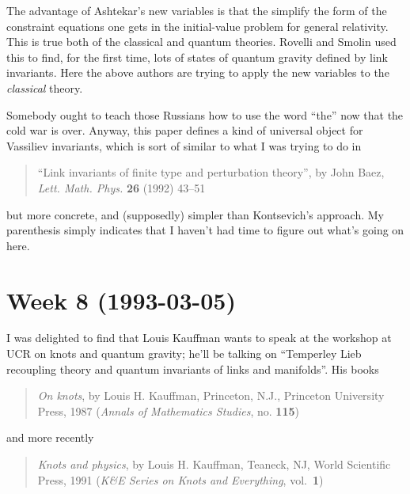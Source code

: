 \documentclass{article}
\def\tightlist{}
\renewcommand{\texttt}[1]{%
  \begingroup
  \ttfamily
  \begingroup\lccode`~=`/\lowercase{\endgroup\def~}{/\discretionary{}{}{}}%
  \begingroup\lccode`~=`[\lowercase{\endgroup\def~}{[\discretionary{}{}{}}%
  \begingroup\lccode`~=`.\lowercase{\endgroup\def~}{.\discretionary{}{}{}}%
  \catcode`/=\active\catcode`[=\active\catcode`.=\active
  \scantokens{#1\noexpand}%
  \endgroup
}
\begin{document}
The advantage of Ashtekar's new variables is that the simplify the form
of the constraint equations one gets in the initial-value problem for
general relativity. This is true both of the classical and quantum
theories. Rovelli and Smolin used this to find, for the first time, lots
of states of quantum gravity defined by link invariants. Here the above
authors are trying to apply the new variables to the \emph{classical}
theory.


Somebody ought to teach those Russians how to use the word ``the'' now
that the cold war is over. Anyway, this paper defines a kind of
universal object for Vassiliev invariants, which is sort of similar to
what I was trying to do in

\begin{quote}
``Link invariants of finite type and perturbation theory'', by John
Baez, \emph{Lett. Math. Phys.} \textbf{26} (1992) 43--51
\end{quote}

but more concrete, and (supposedly) simpler than Kontsevich's approach.
My parenthesis simply indicates that I haven't had time to figure out
what's going on here.
\hypertarget{week-8-1993-03-05}{%
\section{Week 8 (1993-03-05)}\label{week-8-1993-03-05}}

I was delighted to find that Louis Kauffman wants to speak at the
workshop at UCR on knots and quantum gravity; he'll be talking on
``Temperley Lieb recoupling theory and quantum invariants of links and
manifolds''. His books

\begin{quote}
\emph{On knots}, by Louis H. Kauffman, Princeton, N.J., Princeton
University Press, 1987 (\emph{Annals of Mathematics Studies}, no.
\textbf{115})
\end{quote}

and more recently

\begin{quote}
\emph{Knots and physics}, by Louis H. Kauffman, Teaneck, NJ, World
Scientific Press, 1991 (\emph{K\&E Series on Knots and Everything},
vol.~\textbf{1})
\end{quote}
\end{document}
